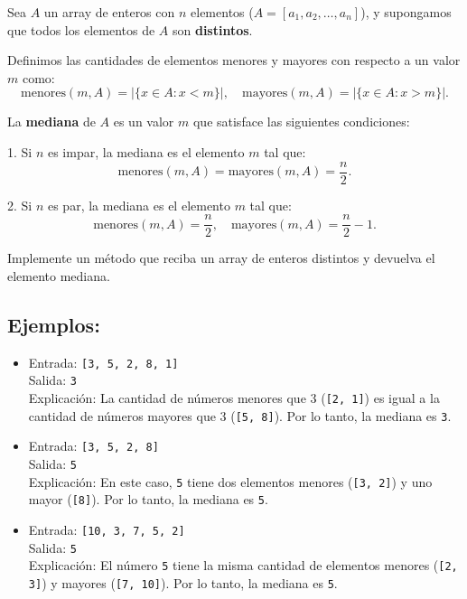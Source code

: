 Sea \( A \) un array de enteros con \( n \) elementos (\( A = [a_1, a_2, \dots, a_n] \)), y supongamos que todos los elementos de \( A \) son \textbf{distintos}.

Definimos las cantidades de elementos menores y mayores con respecto a un valor \( m \) como:
\[
\text{menores}(m, A) = \lvert \{x \in A : x < m\} \rvert, \quad 
\text{mayores}(m, A) = \lvert \{x \in A : x > m\} \rvert.
\]

La \textbf{mediana} de \( A \) es un valor \( m \) que satisface las siguientes condiciones:

1. Si \( n \) es impar, la mediana es el elemento \( m \) tal que:
\[
\text{menores}(m, A) = \text{mayores}(m, A) = \frac{n}{2}.
\]

2. Si \( n \) es par, la mediana es el elemento \( m \) tal que:
\[
\text{menores}(m, A) = \frac{n}{2}, \quad 
\text{mayores}(m, A) = \frac{n}{2} - 1.
\]

Implemente un método que reciba un array de enteros distintos y devuelva el elemento mediana. 

\subsection*{Ejemplos:}
\begin{itemize}
    \item Entrada: \texttt{[3, 5, 2, 8, 1]}\\
    Salida: \texttt{3}\\
    Explicación: La cantidad de números menores que 3 (\texttt{[2, 1]}) es igual a la cantidad de números mayores que 3 (\texttt{[5, 8]}). Por lo tanto, la mediana es \texttt{3}.
    
    \item Entrada: \texttt{[3, 5, 2, 8]}\\
    Salida: \texttt{5}\\
    Explicación: En este caso, \texttt{5} tiene dos elementos menores (\texttt{[3, 2]}) y uno mayor (\texttt{[8]}). Por lo tanto, la mediana es \texttt{5}.
    
    \item Entrada: \texttt{[10, 3, 7, 5, 2]}\\
    Salida: \texttt{5}\\
    Explicación: El número \texttt{5} tiene la misma cantidad de elementos menores (\texttt{[2, 3]}) y mayores (\texttt{[7, 10]}). Por lo tanto, la mediana es \texttt{5}.
\end{itemize}